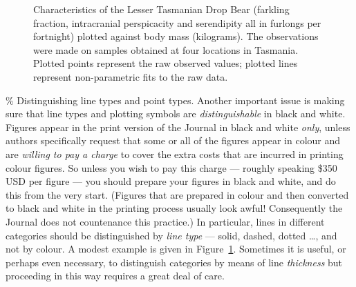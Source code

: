 \documentclass[
  times,
  doublespace]{anzsauth}
\begin{document}
\begin{figure}


\caption{\label{fig-ltdb}Characteristics of the Lesser Tasmanian Drop
Bear (farkling fraction, intracranial perspicacity and serendipity all
in furlongs per fortnight) plotted against body mass (kilograms). The
observations were made on samples obtained at four locations in
Tasmania. Plotted points represent the raw observed values; plotted
lines represent non-parametric fits to the raw data.}

\end{figure}%

\% Distinguishing line types and point types. Another important issue is
making sure that line types and plotting symbols are
\emph{distinguishable} in black and white. Figures appear in the print
version of the Journal in black and white \emph{only}, unless authors
specifically request that some or all of the figures appear in colour
and are \emph{willing to pay a charge} to cover the extra costs that are
incurred in printing colour figures. So unless you wish to pay this
charge --- roughly speaking \$350 USD per figure --- you should prepare
your figures in black and white, and do this from the very start.
(Figures that are prepared in colour and then converted to black and
white in the printing process usually look awful! Consequently the
Journal does not countenance this practice.) In particular, lines in
different categories should be distinguished by \emph{line type} ---
solid, dashed, dotted \ldots, and not by colour. A modest example is
given in Figure~\ref{fig-ltdb}. Sometimes it is useful, or perhaps even
necessary, to distinguish categories by means of line \emph{thickness}
but proceeding in this way requires a great deal of care.
\end{document}
